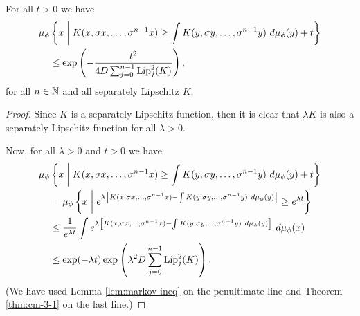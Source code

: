 \begin{corollary}\label{cor:cm-3-1}
	For all $t > 0$ we have
	\begin{align}\label{fml:cm-4}
		\mu_\phi&\left\{x \midmid K(x, \sigma{x}, \dots, \sigma^{n - 1}{x}) \geq \int{K(y, \sigma{y}, \dots, \sigma^{n - 1}{y})\ d\mu_\phi(y)} + t\right\} \nonumber \\
			&\leq \exp\left(-\frac{t^2}{4D\sum_{j = 0}^{n - 1}{\Lip_j^2(K)}}\right),
	\end{align}
	for all $n \in \mathbb{N}$ and all separately Lipschitz $K$.
	\begin{proof}
		Since $K$ is a separately Lipschitz function, then it is clear that $\lambda K$ is also a separately Lipschitz function for all $\lambda > 0$.
		
		Now, for all $\lambda > 0$ and $t > 0$ we have
		\begin{align}
			\mu_\phi&\left\{x \midmid K(x, \sigma{x}, \dots, \sigma^{n - 1}{x}) \geq \int{K(y, \sigma{y}, \dots, \sigma^{n - 1}{y})\ d\mu_\phi(y)} + t\right\} \nonumber \\
				&= \mu_\phi\left\{x \midmid e^{\lambda\left[K(x, \sigma{x}, \dots, \sigma^{n - 1}{x}) - \int{K(y, \sigma{y}, \dots, \sigma^{n - 1}{y})\ d\mu_\phi(y)}\right]} \geq e^{\lambda t}\right\} \nonumber \\
				&\leq \frac{1}{e^{\lambda t}} \int{e^{\lambda\left[K(x, \sigma{x}, \dots, \sigma^{n - 1}{x}) - \int{K(y, \sigma{y}, \dots, \sigma^{n - 1}{y})\ d\mu_\phi(y)}\right]}\ d\mu_\phi(x)} \nonumber \\
				& \leq \exp(-\lambda t) \exp\left(\lambda^2 D \sum_{j = 0}^{n - 1}{\Lip_j^2(K)}\right). \label{fml:cor-3-1-exp}
		\end{align}
		(We have used Lemma \ref{lem:markov-ineq} on the penultimate line and Theorem \ref{thm:cm-3-1} on the last line.)
		

\end{proof}
\end{corollary}
